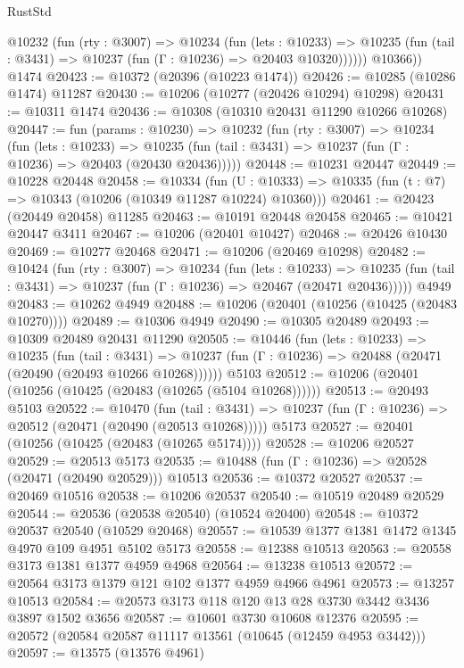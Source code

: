 \begin{lexlean}{RustStd}
\begin{coremodule}
          @10232
            (fun (rty : @3007) =>
            @10234
              (fun (lets : @10233) =>
              @10235 (fun (tail : @3431) => @10237 (fun (Γ : @10236) => @20403 @10320))))))
        @10366))
    @1474
@20423 := @10372 (@20396 (@10223 @1474))
@20426 := @10285 (@10286 @1474) @11287
@20430 := @10206 (@10277 (@20426 @10294) @10298)
@20431 := @10311 @1474
@20436 := @10308 (@10310 @20431 @11290 @10266 @10268)
@20447 := fun (params : @10230) =>
  @10232
    (fun (rty : @3007) =>
    @10234
      (fun (lets : @10233) =>
      @10235 (fun (tail : @3431) => @10237 (fun (Γ : @10236) => @20403 (@20430 @20436)))))
@20448 := @10231 @20447
@20449 := @10228 @20448
@20458 := @10334
    (fun (U : @10333) => @10335 (fun (t : @7) => @10343 (@10206 (@10349 @11287 @10224) @10360)))
@20461 := @20423 (@20449 @20458) @11285
@20463 := @10191 @20448 @20458
@20465 := @10421 @20447 @3411
@20467 := @10206 (@20401 @10427)
@20468 := @20426 @10430
@20469 := @10277 @20468
@20471 := @10206 (@20469 @10298)
@20482 := @10424
    (fun (rty : @3007) =>
    @10234
      (fun (lets : @10233) =>
      @10235 (fun (tail : @3431) => @10237 (fun (Γ : @10236) => @20467 (@20471 @20436)))))
    @4949
@20483 := @10262 @4949
@20488 := @10206 (@20401 (@10256 (@10425 (@20483 @10270))))
@20489 := @10306 @4949
@20490 := @10305 @20489
@20493 := @10309 @20489 @20431 @11290
@20505 := @10446
    (fun (lets : @10233) =>
    @10235
      (fun (tail : @3431) =>
      @10237 (fun (Γ : @10236) => @20488 (@20471 (@20490 (@20493 @10266 @10268))))))
    @5103
@20512 := @10206 (@20401 (@10256 (@10425 (@20483 (@10265 (@5104 @10268))))))
@20513 := @20493 @5103
@20522 := @10470
    (fun (tail : @3431) => @10237 (fun (Γ : @10236) => @20512 (@20471 (@20490 (@20513 @10268)))))
    @5173
@20527 := @20401 (@10256 (@10425 (@20483 (@10265 @5174))))
@20528 := @10206 @20527
@20529 := @20513 @5173
@20535 := @10488 (fun (Γ : @10236) => @20528 (@20471 (@20490 @20529))) @10513
@20536 := @10372 @20527
@20537 := @20469 @10516
@20538 := @10206 @20537
@20540 := @10519 @20489 @20529
@20544 := @20536 (@20538 @20540) (@10524 @20400)
@20548 := @10372 @20537 @20540 (@10529 @20468)
@20557 := @10539 @1377 @1381 @1472 @1345 @4970 @109 @4951 @5102 @5173
@20558 := @12388 @10513
@20563 := @20558 @3173 @1381 @1377 @4959 @4968
@20564 := @13238 @10513
@20572 := @20564 @3173 @1379 @121 @102 @1377 @4959 @4966 @4961
@20573 := @13257 @10513
@20584 := @20573 @3173 @118 @120 @13 @28 @3730 @3442 @3436 @3897 @1502 @3656
@20587 := @10601 @3730 @10608 @12376
@20595 := @20572 (@20584 @20587 @11117 @13561 (@10645 (@12459 @4953 @3442)))
@20597 := @13575 (@13576 @4961)

\end{coremodule}
\end{lexlean}
